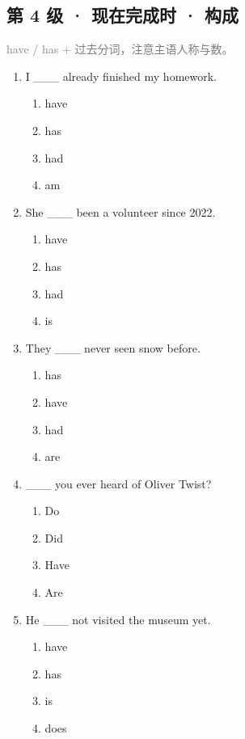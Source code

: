 \documentclass[11pt,a4paper]{ctexart}
\begin{document}
\subsection*{第 4 级 · 现在完成时 · 构成}
\noindent\textcolor{gray}{have / has + 过去分词，注意主语人称与数。}\par\smallskip
\begin{enumerate}[leftmargin=*,itemsep=4pt]
\item I \_\_\_ already finished my homework.
\begin{enumerate}[label=\Alph*.,leftmargin=2em,itemsep=1pt,topsep=2pt]
\item have
\item has
\item had
\item am
\end{enumerate}
\item She \_\_\_ been a volunteer since 2022.
\begin{enumerate}[label=\Alph*.,leftmargin=2em,itemsep=1pt,topsep=2pt]
\item have
\item has
\item had
\item is
\end{enumerate}
\item They \_\_\_ never seen snow before.
\begin{enumerate}[label=\Alph*.,leftmargin=2em,itemsep=1pt,topsep=2pt]
\item has
\item have
\item had
\item are
\end{enumerate}
\item \_\_\_ you ever heard of Oliver Twist?
\begin{enumerate}[label=\Alph*.,leftmargin=2em,itemsep=1pt,topsep=2pt]
\item Do
\item Did
\item Have
\item Are
\end{enumerate}
\item He \_\_\_ not visited the museum yet.
\begin{enumerate}[label=\Alph*.,leftmargin=2em,itemsep=1pt,topsep=2pt]
\item have
\item has
\item is
\item does

\end{enumerate}
\end{enumerate}
\end{document}
